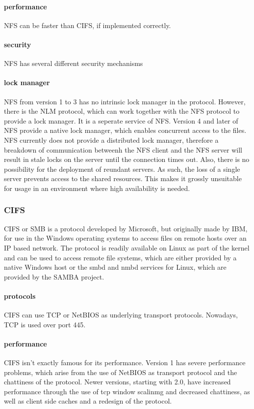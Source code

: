\paragraph{performance}
\ac{NFS} can be faster than \ac{CIFS}, if implemented correctly.
\paragraph{security}
\ac{NFS} has several different security mechanisms
\paragraph{lock manager}
\ac{NFS} from version 1 to 3 has no intrinsic lock manager in the protocol. However, there is the \ac{NLM}
protocol, which can work together with the \ac{NFS} protocol to provide a lock manager.
It is a seperate service of \ac{NFS}.
Version 4 and later of \ac{NFS} provide a native lock manager, which enables concurrent access to the files.
\linebreak[3]
\ac{NFS} currently does not provide a distributed lock manager, therefore a breakdown
of communication betweenh the \ac{NFS} client and the \ac{NFS} server will result in stale locks
on the server until the connection times out. Also, there is no possibility
for the deployment of reundant servers. As such, the loss of a single server prevents
access to the shared resources. This makes it grossly unsuitable for usage in an environment
where high availability is needed.

\subsubsection{\ac{CIFS}}
\ac{CIFS} or \ac{SMB} is a protocol developed by Microsoft, but originally made
by IBM, for use in the Windows operating systems to access files on remote hosts
over an IP based network. The protocol is readily available on Linux as part
of the kernel and can be used to access remote file systems, which are
either provided by a native Windows host or the smbd and nmbd services for Linux,
which are provided by the SAMBA project.
\paragraph{protocols}
\ac{CIFS} can use TCP or NetBIOS as underlying transport protocols. Nowadays, TCP is
used over port 445.
\paragraph{performance}
\ac{CIFS} isn't exactly famous for its performance. Version 1 has severe performance
problems, which arise from the use of NetBIOS as transport protocol and the
chattiness of the protocol. Newer versions, starting with 2.0, have increased
performance through the use of tcp window scalinmg and decreased chattiness, as well
as client side caches and a redesign of the protocol.
